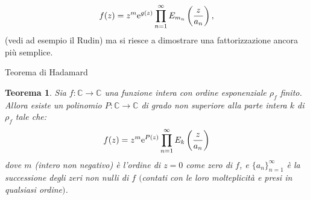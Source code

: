 \documentclass[11pt]{book}
\theoremstyle{Definizione}
\theoremstyle{TeoremaProposizioneLemmaCorollarioCongettura}
\newtheorem{myteo}{Teorema}[section]
\theoremstyle{OsservazioneNotaEsempio}
\newcommand{\C}{\mathbb{C}}
\newcommand{\e}{\textup{e}}
\begin{document}
$$
f(z) = z^m \e^{g(z)} \prod_{n = 1}^\infty E_{m_n}\left(\frac{z}{a_n}\right),
$$
(vedi ad esempio il Rudin) ma si riesce a dimostrare una fattorizzazione ancora più semplice.
\begin{boxteo}{Teorema di Hadamard}
\begin{myteo}\label{teo:TeoremaDiHadamardFattorizzazione}
Sia $f:\C\longrightarrow \C$ una funzione intera con ordine esponenziale $\rho_f$ finito. Allora esiste un polinomio $P:\C\longrightarrow \C$ di grado non superiore alla parte intera $k$ di $\rho_f$ tale che:
\begin{equation}\label{eq:teo:FattorizzazioneDiHadamard}
f(z) = z^m \e^{P(z)} \prod_{n = 1}^\infty E_k\left(\frac{z}{a_n}\right)
\end{equation}
dove $m$ (intero non negativo) è l'ordine di $z = 0$ come zero di $f$, e $\{a_n\}_{n = 1}^\infty$ è la successione degli zeri non nulli di $f$ $($contati con le loro molteplicità e presi in qualsiasi ordine$)$.
\end{myteo}
\end{boxteo}
\end{document}
